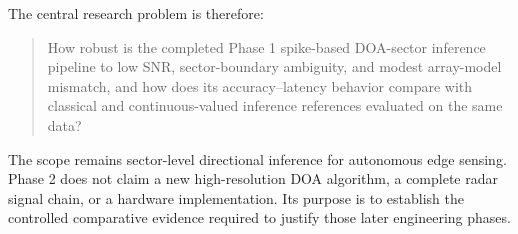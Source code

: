 The central research problem is therefore:

\begin{quote}
How robust is the completed Phase 1 spike-based DOA-sector inference pipeline to low SNR, sector-boundary ambiguity, and modest array-model mismatch, and how does its accuracy--latency behavior compare with classical and continuous-valued inference references evaluated on the same data?
\end{quote}

The scope remains sector-level directional inference for autonomous edge sensing. Phase 2 does not claim a new high-resolution DOA algorithm, a complete radar signal chain, or a hardware implementation. Its purpose is to establish the controlled comparative evidence required to justify those later engineering phases.
